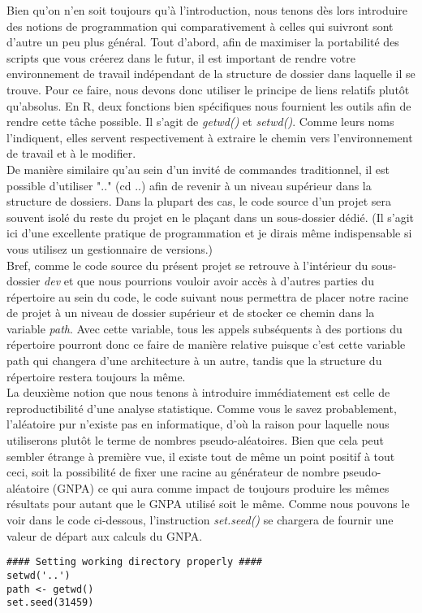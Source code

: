 \noindent
Bien qu'on n'en soit toujours qu'à l'introduction, nous tenons dès lors introduire des notions de programmation qui comparativement à celles qui suivront sont d'autre un peu plus général. Tout d'abord, afin de maximiser la portabilité des scripts que vous créerez dans le futur, il est important de rendre votre environnement de travail indépendant de la structure de dossier dans laquelle il se trouve. Pour ce faire, nous devons donc utiliser le principe de liens relatifs plutôt qu'absolus. En R, deux fonctions bien spécifiques nous fournient les outils afin de rendre cette tâche possible. Il s'agit de \emph{getwd()} et \emph{setwd()}. Comme leurs noms l'indiquent, elles servent respectivement à extraire le chemin vers l'environnement de travail et à le modifier. \\

\noindent
De manière similaire qu'au sein d'un invité de commandes traditionnel, il est possible d'utiliser ".." (cd ..) afin de revenir à un niveau supérieur dans la structure de dossiers. Dans la plupart des cas, le code source d'un projet sera souvent isolé du reste du projet en le plaçant dans un sous-dossier dédié. (Il s'agit ici d'une excellente pratique de programmation et je dirais même indispensable si vous utilisez un gestionnaire de versions.) \\

\noindent
Bref, comme le code source du présent projet se retrouve à l'intérieur du sous-dossier \emph{dev} et que nous pourrions vouloir avoir accès à d'autres parties du répertoire au sein du code, le code suivant nous permettra de placer notre racine de projet à un niveau de dossier supérieur et de stocker ce chemin dans la variable \emph{path}. Avec cette variable, tous les appels subséquents à des portions du répertoire pourront donc ce faire de manière relative puisque c'est cette variable path qui changera d'une architecture à un autre, tandis que la structure du répertoire restera toujours la même. \\

\noindent
La deuxième notion que nous tenons à introduire immédiatement est celle de reproductibilité d'une analyse statistique. Comme vous le savez probablement, l'aléatoire pur n'existe pas en informatique, d'où la raison pour laquelle nous utiliserons plutôt le terme de nombres pseudo-aléatoires. Bien que cela peut sembler étrange à première vue, il existe tout de même un point positif à tout ceci, soit la possibilité de fixer une racine au générateur de nombre pseudo-aléatoire (GNPA) ce qui aura comme impact de toujours produire les mêmes résultats pour autant que le GNPA utilisé soit le même. Comme nous pouvons le voir dans le code ci-dessous, l'instruction \emph{set.seed()} se chargera de fournir une valeur de départ aux calculs du GNPA.

\begin{lstlisting}
#### Setting working directory properly ####
setwd('..')
path <- getwd()
set.seed(31459)
\end{lstlisting} 
